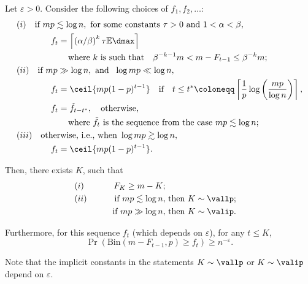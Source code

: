 \begin{lemma}
\label{lemma:find_one_col_lb}
    Let $\varepsilon > 0$. Consider the following choices of \(f_1, f_2, \ldots\):
    \begin{equation*}
        \begin{aligned}
            &(i) \quad  \text{if } mp \lesssim \log n, \text{ for some constants } \tau > 0 \text{ and } 1 < \alpha < \beta, \\
            &\qquad \qquad f_t = \left\lceil\left(\alpha / \beta \right)^k \tau\mathbb{E}\dmax\right\rceil \\
            &\qquad \qquad \qquad \text{where } k \text{ is such that} \quad \beta^{-k-1}m < m - F_{t-1} \leq \beta^{-k}m; \\
            &(ii) \quad  \text{if } mp \gg \log n, \  \text{and }\ \log mp \ll \log n, \\
            &\qquad \qquad f_t =  \ceil{mp(1-p)^{t-1}} \quad \text{if} \quad t \leq t^* \coloneqq \left\lceil \frac{1}{p}\log  \left(\frac{mp}{\log n}\right)\right \rceil,\\
            &\qquad \qquad f_t = \tilde{f}_{t - t^*}, \quad \text{otherwise,} \\
            &\qquad \qquad \qquad \text{where } \tilde{f}_t \text{ is the sequence from the case } mp \lesssim \log n; \\
            &(iii) \quad  \text{otherwise, i.e., when } \log mp \gtrsim \log n, \\
            &\qquad \qquad f_t = \ceil{mp(1-p)^{t - 1}}.
        \end{aligned}
    \end{equation*}

    \noindent
    Then, there exists \(K\), such that 
    \begin{equation}
    \label{eq:cover_size}
    \begin{aligned}
        &(i) \qquad &F_K \geq m - K; \\
        &(ii) \qquad &\text{if } mp \lesssim \log n, &\text{ then } K \sim \vallp; \\
        & \qquad \quad \  &\text{if } mp \gg \log n, &\text{ then } K \sim \valip.
    \end{aligned}
    \end{equation} 
    
    \noindent
    Furthermore, for this sequence \(f_t\) (which depends on \(\varepsilon\)), for any \(t \leq K\),
    \begin{equation}
        \Pr (\mathrm{Bin}(m - F_{t - 1}, p) \geq f_t) \geq n^{-\varepsilon}.
    \end{equation} 

\noindent
    Note that the implicit constants in the statements \(K \sim \vallp\) or \(K \sim \valip\) depend on \(\varepsilon\).
\end{lemma}
